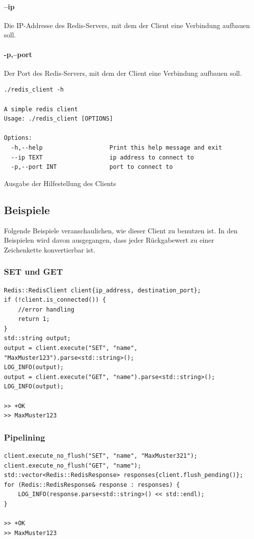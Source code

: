 \documentclass[12pt, letterpaper]{article}
\newenvironment{code}{\captionsetup{type=listing}}{}
\begin{document}
\paragraph{--ip}
Die IP-Addresse des Redis-Servers, mit dem der Client eine Verbindung aufbauen soll.

\paragraph{-p,--port}
Der Port des Redis-Servers, mit dem der Client eine Verbindung aufbauen soll.


\begin{code}
  \begin{verbatim}
./redis_client -h

A simple redis client
Usage: ./redis_client [OPTIONS]

Options:
  -h,--help                   Print this help message and exit
  --ip TEXT                   ip address to connect to
  -p,--port INT               port to connect to
  \end{verbatim}
  \caption{Ausgabe der Hilfestellung des Clients}
\end{code}

\subsection{Beispiele}
Folgende Beispiele veranschaulichen, wie dieser Client zu benutzen ist. In den Beispielen wird davon ausgegangen, dass jeder Rückgabewert zu einer Zeichenkette konvertierbar ist. 

\newpage

\subsubsection{SET und GET}
\begin{code}
\begin{verbatim}
Redis::RedisClient client{ip_address, destination_port};
if (!client.is_connected()) {
    //error handling
    return 1;
}
std::string output;
output = client.execute("SET", "name", "MaxMuster123").parse<std::string>();
LOG_INFO(output);
output = client.execute("GET", "name").parse<std::string>();
LOG_INFO(output);

>> +OK
>> MaxMuster123
\end{verbatim}  
\end{code}

\subsubsection{Pipelining}
\begin{code}
\begin{verbatim}
client.execute_no_flush("SET", "name", "MaxMuster321");
client.execute_no_flush("GET", "name");
std::vector<Redis::RedisResponse> responses{client.flush_pending()};
for (Redis::RedisResponse& response : responses) {
    LOG_INFO(response.parse<std::string>() << std::endl);
}

>> +OK
>> MaxMuster123
\end{verbatim}  
\end{code}
\end{document}
